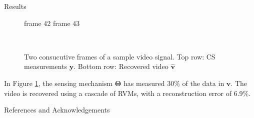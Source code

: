 \documentclass[final]{beamer}
\begin{document}
\begin{frame}{}
\begin{textblock}{19.5}
\begin{block}{Results}
\begin{figure}
\begin{minipage}{0.8\linewidth}
\scriptsize\hphantom{.}\hspace{2.5cm} frame 42 \hspace{3cm} frame 43
\end{minipage}\\
\begin{minipage}{0.95\linewidth}
\caption{Two consucutive frames of a sample video signal.
  Top row: CS measurements $\bm y$. 
  Bottom row: Recovered video $\bm{\hat v}$}
\label{fig}
\end{minipage}
\end{figure}
In Figure \ref{fig}, the sensing mechanism $\bm\Theta$ has measured 30\% of the data in $\bm v$. 
The video is recovered using a cascade of RVMs, with a reconstruction error of 6.9\%.


\end{block}

\begin{block}{References and Acknowledgements}
\begin{minipage}{.9\linewidth}
     {     \printbibliography   %
     } 
\end{minipage}
\vspace{2ex}
\end{block}

\end{textblock}

\end{frame}
\end{document}
